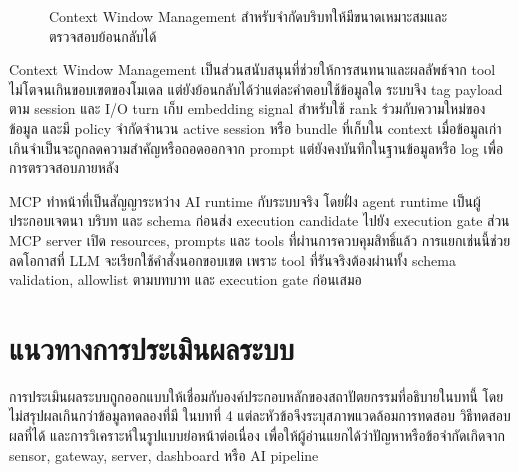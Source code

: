 \begin{figure}[!htbp]
    \centering
    \caption{Context Window Management สำหรับจำกัดบริบทให้มีขนาดเหมาะสมและตรวจสอบย้อนกลับได้}
    \label{fig:ch3_ai_context_window}
\end{figure}
\FloatBarrier

Context Window Management เป็นส่วนสนับสนุนที่ช่วยให้การสนทนาและผลลัพธ์จาก tool ไม่โตจนเกินขอบเขตของโมเดล แต่ยังย้อนกลับได้ว่าแต่ละคำตอบใช้ข้อมูลใด ระบบจึง tag payload ตาม session และ I/O turn เก็บ embedding signal สำหรับใช้ rank ร่วมกับความใหม่ของข้อมูล และมี policy จำกัดจำนวน active session หรือ bundle ที่เก็บใน context เมื่อข้อมูลเก่าเกินจำเป็นจะถูกลดความสำคัญหรือถอดออกจาก prompt แต่ยังคงบันทึกในฐานข้อมูลหรือ log เพื่อการตรวจสอบภายหลัง

MCP ทำหน้าที่เป็นสัญญาระหว่าง AI runtime กับระบบจริง โดยฝั่ง agent runtime เป็นผู้ประกอบเจตนา บริบท และ schema ก่อนส่ง execution candidate ไปยัง execution gate ส่วน MCP server เปิด resources, prompts และ tools ที่ผ่านการควบคุมสิทธิ์แล้ว การแยกเช่นนี้ช่วยลดโอกาสที่ LLM จะเรียกใช้คำสั่งนอกขอบเขต เพราะ tool ที่รันจริงต้องผ่านทั้ง schema validation, allowlist ตามบทบาท และ execution gate ก่อนเสมอ

\section{แนวทางการประเมินผลระบบ}
\label{sec:ch3_evaluation_plan}
การประเมินผลระบบถูกออกแบบให้เชื่อมกับองค์ประกอบหลักของสถาปัตยกรรมที่อธิบายในบทนี้ โดยไม่สรุปผลเกินกว่าข้อมูลทดลองที่มี ในบทที่ 4 แต่ละหัวข้อจึงระบุสภาพแวดล้อมการทดสอบ วิธีทดสอบ ผลที่ได้ และการวิเคราะห์ในรูปแบบย่อหน้าต่อเนื่อง เพื่อให้ผู้อ่านแยกได้ว่าปัญหาหรือข้อจำกัดเกิดจาก sensor, gateway, server, dashboard หรือ AI pipeline

